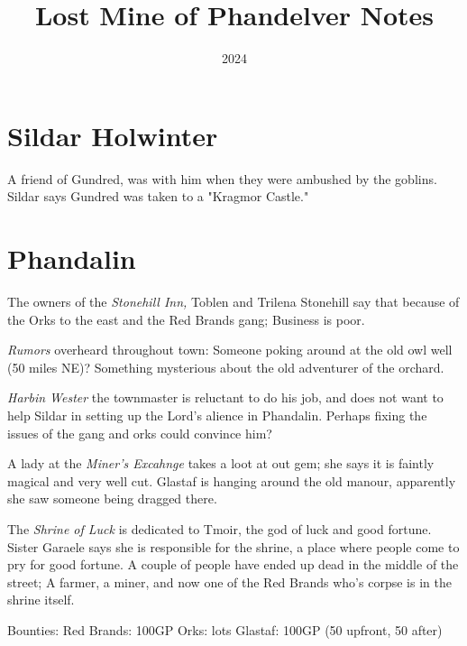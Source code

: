 \documentclass{article}
\title{Lost Mine of Phandelver Notes}
\date{2024}
\begin{document}
\maketitle
\section{Sildar Holwinter}
A friend of Gundred, was with him when they were ambushed by the goblins. Sildar says Gundred was taken to a "Kragmor Castle."
\section{Phandalin}
The owners of the \emph{Stonehill Inn,} Toblen and Trilena Stonehill say that because of the Orks to the east and the Red Brands gang; Business is poor.

\emph{Rumors} overheard throughout town:
Someone poking around at the old owl well (50 miles NE)?
Something mysterious about the old adventurer of the orchard.

\emph{Harbin Wester} the townmaster is reluctant to do his job, and does not want to help Sildar in setting up the Lord's alience in Phandalin. Perhaps fixing the issues of the gang and orks could convince him?

A lady at the \emph{Miner's Excahnge} takes a loot at out gem; she says it is faintly magical and very well cut. Glastaf is hanging around the old manour, apparently she saw someone being dragged there.

The \emph{Shrine of Luck} is dedicated to Tmoir, the god of luck and good fortune. Sister Garaele says she is responsible for the shrine, a place where people come to pry for good fortune. A couple of people have ended up dead in the middle of the street; A farmer, a miner, and now one of the Red Brands who's corpse is in the shrine itself.

Bounties:
	Red Brands: 100GP
	Orks: lots
	Glastaf: 100GP (50 upfront, 50 after)
\end{document}
